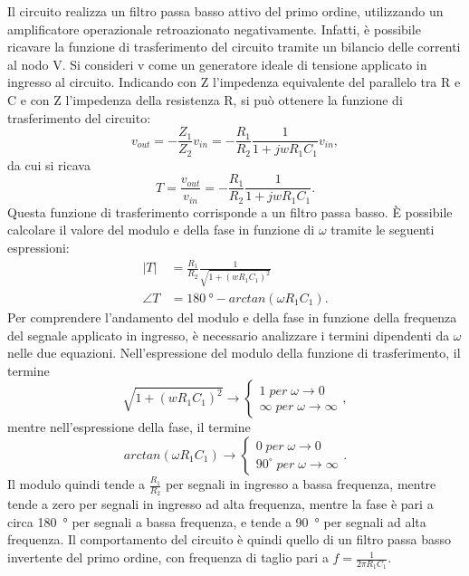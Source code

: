 Il circuito realizza un filtro passa basso attivo del primo ordine, utilizzando un amplificatore operazionale retroazionato negativamente. Infatti, è possibile ricavare la funzione di trasferimento del circuito tramite un bilancio delle correnti al nodo V\super{-}. Si consideri v come un generatore ideale di tensione applicato in ingresso al circuito. Indicando con Z l'impedenza equivalente del parallelo tra R e C e con Z l'impedenza della resistenza R, si può ottenere la funzione di trasferimento del circuito:
\begin{equation}
	v_{out}=-\frac{Z_1}{Z_2}v_{in}=-\frac{R_1}{R_2}\frac{1}{1+j w R_1 C_1} v_{in},
\end{equation}
da cui si ricava
\begin{equation}
	T=\frac{v_{out}}{v_{in}}=-\frac{R_1}{R_2}\frac{1}{1+j w R_1 C_1}.
\end{equation}
Questa funzione di trasferimento corrisponde a un filtro passa basso. È possibile calcolare il valore del modulo e della fase in funzione di $\omega$ tramite le seguenti espressioni:
\begin{equation}
	\begin{split}
		|T|&=\frac{R_1}{R_2}\frac{1}{\sqrt{1+(wR_1C_1)^2}} \\
		\angle T&=\SI{180}{\degree}-arctan(\omega R_1 C_1).
	\end{split}
	\label{eq:1.3}
\end{equation}
Per comprendere l'andamento del modulo e della fase in funzione della frequenza del segnale applicato in ingresso, è necessario analizzare i termini dipendenti da $\omega$ nelle due equazioni. Nell'espressione del modulo della funzione di trasferimento, il termine 
\begin{equation}
	\sqrt{1+(wR_1C_1)^2} \to
	\begin{cases}
		1 \; per \; \omega \to 0 \\
		\infty \; per \; \omega \to \infty
	\end{cases}
,
\end{equation}
mentre nell'espressione della fase, il termine
\begin{equation}
	arctan(\omega R_1 C_1) \to
	\begin{cases}
		0 \; per \; \omega \to 0 \\
		90^\circ \; per \; \omega \to \infty
	\end{cases}
	.
\end{equation}
Il modulo quindi tende a $\frac{R_1}{R_2}$ per segnali in ingresso a bassa frequenza, mentre tende a zero per segnali in ingresso ad alta frequenza, mentre la fase è pari a circa \SI{180}{\degree} per segnali a bassa frequenza, e tende a \SI{90}{\degree} per segnali ad alta frequenza.
Il comportamento del circuito è quindi quello di un filtro passa basso invertente del primo ordine, con frequenza di taglio pari a $f=\frac{1}{2\pi R_1C_1}$.

